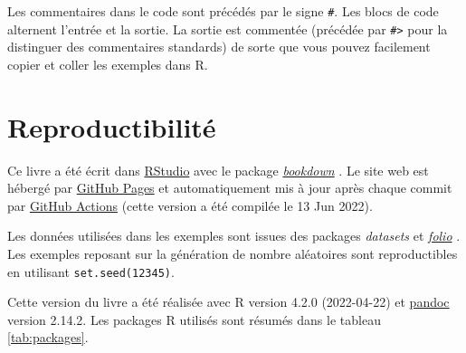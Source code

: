 \documentclass[
  french,
]{scrbook}
\begin{document}
Les commentaires dans le code sont précédés par le signe \texttt{\#}. Les blocs de code alternent l'entrée et la sortie. La sortie est commentée (précédée par \texttt{\#\textgreater{}} pour la distinguer des commentaires standards) de sorte que vous pouvez facilement copier et coller les exemples dans R.

\hypertarget{reproductibilituxe9}{%
\section*{Reproductibilité}\label{reproductibilituxe9}}

Ce livre a été écrit dans \href{http://www.rstudio.com/ide/}{RStudio} avec le package \href{http://bookdown.org/}{\emph{bookdown}} \autocite{bookdown2016}. Le site web est hébergé par \href{https://pages.github.com/}{GitHub Pages} et automatiquement mis à jour après chaque commit par \href{https://github.com/nfrerebeau/rarcheo/actions}{GitHub Actions} (cette version a été compilée le 13 Jun 2022).

Les données utilisées dans les exemples sont issues des packages \emph{datasets} \autocite{R-base} et \href{https://packages.tesselle.org/folio/}{\emph{folio}} \autocite{R-folio}. Les exemples reposant sur la génération de nombre aléatoires sont reproductibles en utilisant \texttt{set.seed(12345)}.

Cette version du livre a été réalisée avec R version 4.2.0 (2022-04-22) et \href{https://pandoc.org/}{pandoc} version 2.14.2. Les packages R utilisés sont résumés dans le tableau \ref{tab:packages}.
\end{document}
